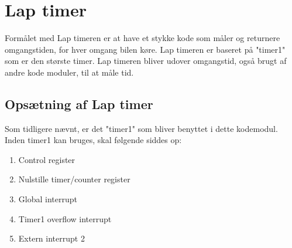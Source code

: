 \newpage

\section{Lap timer}
Formålet med Lap timeren er at have et stykke kode som måler og returnere omgangstiden, for hver omgang bilen køre. Lap timeren er baseret på "timer1" som er den største timer. Lap timeren bliver udover omgangstid, også brugt af andre kode moduler, til at måle tid.
\subsection{Opsætning af Lap timer}
Som tidligere nævnt, er det "timer1" som bliver benyttet i dette kodemodul. Inden timer1 kan bruges, skal følgende siddes op:
\begin{enumerate}
\item Control register
\item Nulstille timer/counter register
\item Global interrupt
\item Timer1 overflow interrupt
\item Extern interrupt 2 
\end{enumerate}

